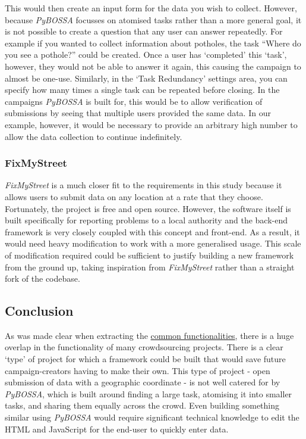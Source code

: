 \documentclass{article}
\begin{document}
		This would then create an input form for the data you wish to collect. However, because \emph{PyBOSSA} focusses on atomised tasks rather than a more general goal, it is not possible to create a question that any user can answer repeatedly. For example if you wanted to collect information about potholes, the task ``Where do you see a pothole?'' could be created. Once a user has `completed' this `task', however, they would not be able to answer it again, this causing the campaign to almost be one-use. Similarly, in the `Task Redundancy' settings area, you can specify how many times a single task can be repeated before closing. In the campaigns \emph{PyBOSSA} is built for, this would be to allow verification of submissions by seeing that multiple users provided the same data. In our example, however, it would be necessary to provide an arbitrary high number to allow the data collection to continue indefinitely.

		\subsubsection{FixMyStreet}

		\emph{FixMyStreet} is a much closer fit to the requirements in this study because it allows users to submit data on any location at a rate that they choose. Fortunately, the project is free\cite{_mysociety/fixmystreet_2015} and open source. However, the software itself is built specifically for reporting problems to a local authority and the back-end framework is very closely coupled with this concept and front-end. As a result, it would need heavy modification to work with a more generalised usage. This scale of modification required could be sufficient to justify building a new framework from the ground up, taking inspiration from \emph{FixMyStreet} rather than a straight fork of the codebase.

		\subsection{Conclusion}

		As was made clear when extracting the \hyperref[sec:common-functionalities]{common functionalities}, there is a huge overlap in the functionality of many crowdsourcing projects. There is a clear `type' of project for which a framework could be built that would save future campaign-creators having to make their own. This type of project - open submission of data with a geographic coordinate - is not well catered for by \emph{PyBOSSA}, which is built around finding a large task, atomising it into smaller tasks, and sharing them equally across the crowd. Even building something similar using \emph{PyBOSSA} would require significant technical knowledge to edit the HTML and JavaScript for the end-user to quickly enter data.
\end{document}
